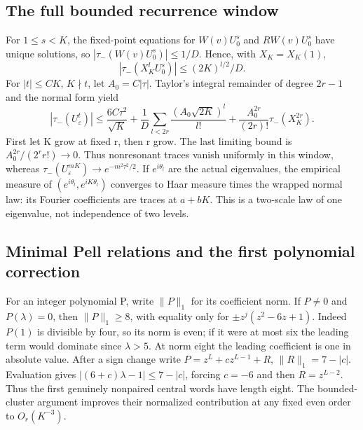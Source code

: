\subsection{The full bounded recurrence window}
For $1\leq s<K$, the fixed-point equations for $W(v)U_0^s$ and
$RW(v)U_0^s$ have unique solutions, so
$|\tau_-(W(v)U_0^s)|\leq1/D$. Hence, with $X_K=X_K(1)$,
\[
 |\tau_-(X_K^lU_0^s)|\leq(2K)^{l/2}/D.
\]
For $|t|\leq CK$, $K\nmid t$, let $A_0=C|\tau|$. Taylor's integral
remainder of degree $2r-1$ and the normal form yield
\[
 |\tau_-(U_\varepsilon^t)|
 \leq\frac{6C\tau^2}{\sqrt K}
 +\frac1D\sum_{l<2r}\frac{(A_0\sqrt{2K})^l}{l!}
 +\frac{A_0^{2r}}{(2r)!}\tau_-(X_K^{2r}).
\]
First let K grow at fixed r, then r grow. The last limiting bound is
$A_0^{2r}/(2^rr!)\to0$. Thus nonresonant traces vanish uniformly in this
window, whereas $\tau_-(U_\varepsilon^{mK})\to e^{-m^2\tau^2/2}$.
If $e^{i\theta_l}$ are the actual eigenvalues, the empirical measure of
$(e^{i\theta_l},e^{iK\theta_l})$ converges to Haar measure times the wrapped
normal law: its Fourier coefficients are traces at $a+bK$.
This is a two-scale law of one eigenvalue, not independence of two levels.

\subsection{Minimal Pell relations and the first polynomial correction}
For an integer polynomial P, write $\|P\|_1$ for its coefficient norm.
If $P\ne0$ and $P(\lambda)=0$, then $\|P\|_1\geq8$, with equality only for
$\pm z^j(z^2-6z+1)$. Indeed $P(1)$ is divisible by four, so its norm is even;
if it were at most six the leading term would dominate since $\lambda>5$.
At norm eight the leading coefficient is one in absolute value. After a sign
change write $P=z^L+c z^{L-1}+R$, $\|R\|_1=7-|c|$. Evaluation gives
$|(6+c)\lambda-1|\leq7-|c|$, forcing $c=-6$ and then
$R=z^{L-2}$. Thus the first genuinely nonpaired central words have length eight.
The bounded-cluster argument improves their normalized contribution at any
fixed even order to $O_r(K^{-3})$.

